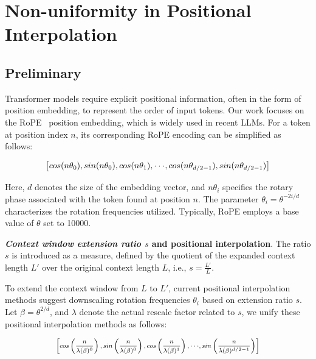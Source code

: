 \section{Non-uniformity in Positional Interpolation}
\label{sec:analysis}

\subsection{Preliminary}

Transformer models require explicit positional information, often in the form of position embedding, to represent the order of input tokens. Our work focuses on the RoPE~\cite{rope} position embedding, which is widely used in recent  LLMs. For a token at position index $n$, its corresponding RoPE encoding can be simplified as follows:

\begin{equation}
		\fontsize{7.8}{7.8} \selectfont
	\label{eq:rope}
	\left[ cos(n\theta_0), sin(n\theta_0), cos(n\theta_1), \cdot\cdot\cdot, cos(n\theta_{d/2-1}), sin(n\theta_{d/2-1}) \right]   
\end{equation}

Here, $d$ denotes the size of the embedding vector, and $n\theta_i$ specifies the rotary phase associated with the token found at position $n$. The parameter $\theta_i=\theta^{-2i/d}$ characterizes the rotation frequencies utilized. Typically, RoPE employs a base value of $\theta$ set to 10000.

\textbf{\emph{Context window extension ratio $s$} and positional interpolation}. The ratio $s$ is introduced as a measure, defined by the quotient of the expanded context length $L'$ over the original context length $L$, i.e., $s=\frac{L'}{L}$.

To extend the context window from $L$ to $L'$, current positional interpolation methods suggest downscaling rotation frequencies $\theta_i$ based on extension ratio $s$. Let $\beta=\theta^{2/d}$, and $\lambda$ denote the actual rescale factor related to $s$, we   unify these positional interpolation methods as follows:

\begin{equation}	
	\fontsize{7.5}{7.5} \selectfont
	\label{eq:unified_rope}
	\begin{aligned}
		\left[cos\left(\frac{n}{\lambda(\beta)^0}\right), sin \left(\frac{n}{\lambda(\beta)^0}\right), cos\left(\frac{n}{\lambda(\beta)^1}\right), \cdot\cdot\cdot,  sin \left(\frac{n}{\lambda(\beta)^{d/2-1}}\right) \right]   
	\end{aligned}
\end{equation}

